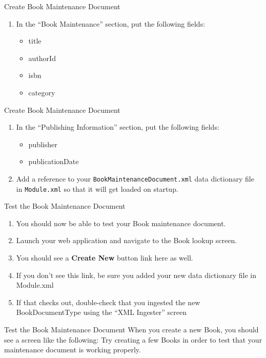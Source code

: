 \documentclass[xcolor=dvipsnames,14pt,professionalfonts]{beamer}
\begin{document}
\begin{frame}{Create Book Maintenance Document}
  \begin{enumerate}
    \item In the “Book Maintenance” section, put the following fields:
      \begin{itemize}
      \item title
      \item authorId
      \item isbn
      \item category
\end{itemize}
  \end{enumerate}
\end{frame}

\begin{frame}{Create Book Maintenance Document}
  \begin{enumerate}
  \item In the “Publishing Information” section, put the following fields:
      \begin{itemize}
      \item publisher
      \item publicationDate
\end{itemize}
\item Add a reference to your \texttt{BookMaintenanceDocument.xml} data
  dictionary file in \texttt{Module.xml} so that it will get loaded on startup.
  \end{enumerate}
\end{frame}
 
\begin{frame}{Test the Book Maintenance Document}
  \begin{enumerate}
  \item You should now be able to test your Book maintenance document.
  \item Launch your web application and navigate to the Book lookup screen.
  \item You should see a \textbf{Create New} button link here as well.
  \item If you don’t see this link, be sure you added your new data dictionary file in Module.xml
  \item If that checks out, double-check that you ingested the new BookDocumentType using the “XML Ingester” screen
    \end{enumerate}
  \end{frame}

\begin{frame}{Test the Book Maintenance Document}
   When you create a new Book, you should see a screen like the
    following:
    Try creating a few Books in order to test that your maintenance document is working properly.
  \end{frame}
\end{document}
